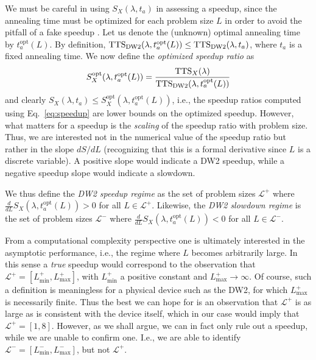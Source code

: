 We must be careful in using $S_X(\lambda,t_a)$ in assessing a speedup, since the annealing time must be optimized for each problem size $L$ in order to avoid the pitfall of a fake speedup \cite{speedup}. Let us denote the (unknown) optimal annealing time by $t_a^{\mathrm{opt}}(L)$. By definition, $\textrm{TTS}_{\textrm{DW2}}(\lambda,t_a^{\mathrm{opt}}(L)) \leq \textrm{TTS}_{\textrm{DW2}}(\lambda,t_a)$, where $t_a$ is a fixed annealing time.
We now define the \emph{optimized speedup ratio} as
%
\begin{align}
\label{eq:speedup-opt}
S_X^{\textrm{opt}}(\lambda,t_a^{\mathrm{opt}}(L)) = \frac{\textrm{TTS}_X(\lambda)}{\textrm{TTS}_{\textrm{DW2}}(\lambda,t_a^{\mathrm{opt}}(L))}
\end{align}
%
and clearly $
S_X(\lambda,t_a) \leq  S_X^{\textrm{opt}}(\lambda,t_a^{\mathrm{opt}}(L))$, i.e., the speedup ratios computed using Eq.~\eqref{eq:speedup} are lower bounds on the optimized speedup. However,
what matters for a speedup is the \emph{scaling} of the speedup ratio with problem size. Thus, we are interested not in the numerical value of the speedup ratio but rather in the slope $dS/dL$ (recognizing that this is a formal derivative since $L$ is a discrete variable). A positive slope would indicate a DW2 speedup, while a negative speedup slope would indicate a slowdown.

We thus define the \emph{DW2 speedup regime} as the set of problem sizes $\mathcal{L}^+$ where $\frac{d}{dL} S_X(\lambda,t_a^{\mathrm{opt}}(L)) > 0$ for all $L\in \mathcal{L}^+$. Likewise, the \emph{DW2 slowdown regime} is the set of problem sizes $\mathcal{L}^-$ where $\frac{d}{dL} S_X(\lambda,t_a^{\mathrm{opt}}(L)) < 0$ for all $L\in \mathcal{L}^-$.

From a computational complexity perspective one is ultimately interested in the asymptotic performance, i.e., the regime where $L$ becomes arbitrarily large. In this sense a \emph{true} speedup would correspond to  the observation that $\mathcal{L}^+ = [L^+_{\min},L^+_{\max}]$, with $L^+_{\min}$ a positive constant and $L^+_{\max} \rightarrow \infty$. Of course, such a definition is meaningless for a physical device such as the DW2, for which $L^+_{\max}$ is necessarily finite. Thus the best we can hope for is an observation that $\mathcal{L}^+$ is as large as is consistent with the device itself, which in our case would imply that $\mathcal{L}^+ =[1,8]$. However, as we shall argue, we can in fact only rule out a speedup, while we are unable to confirm one. I.e., we are able to identify $\mathcal{L}^- = [L^-_{\min},L^-_{\max}]$, but not $\mathcal{L}^+$.

